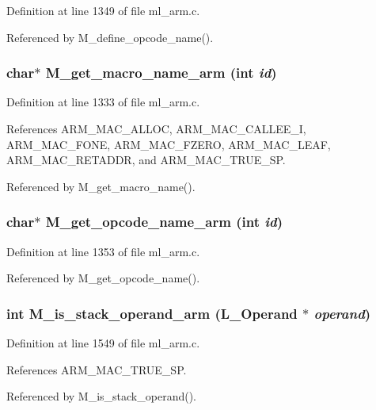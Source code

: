 Definition at line 1349 of file ml\_\-arm.c.

Referenced by M\_\-define\_\-opcode\_\-name().
\subsubsection{\setlength{\rightskip}{0pt plus 5cm}char$\ast$ M\_\-get\_\-macro\_\-name\_\-arm (int {\em id})}\label{m__arm_8h_1ccd24554d6d2b03ca45a0859999f4b8}




Definition at line 1333 of file ml\_\-arm.c.

References ARM\_\-MAC\_\-ALLOC, ARM\_\-MAC\_\-CALLEE\_\-I, ARM\_\-MAC\_\-FONE, ARM\_\-MAC\_\-FZERO, ARM\_\-MAC\_\-LEAF, ARM\_\-MAC\_\-RETADDR, and ARM\_\-MAC\_\-TRUE\_\-SP.

Referenced by M\_\-get\_\-macro\_\-name().
\subsubsection{\setlength{\rightskip}{0pt plus 5cm}char$\ast$ M\_\-get\_\-opcode\_\-name\_\-arm (int {\em id})}\label{m__arm_8h_1e4a4dc60acbb2a8c03f10f0f7ed72fd}




Definition at line 1353 of file ml\_\-arm.c.

Referenced by M\_\-get\_\-opcode\_\-name().
\subsubsection{\setlength{\rightskip}{0pt plus 5cm}int M\_\-is\_\-stack\_\-operand\_\-arm (L\_\-Operand $\ast$ {\em operand})}\label{m__arm_8h_904277c499831273a69c6082decbf484}




Definition at line 1549 of file ml\_\-arm.c.

References ARM\_\-MAC\_\-TRUE\_\-SP.

Referenced by M\_\-is\_\-stack\_\-operand().
